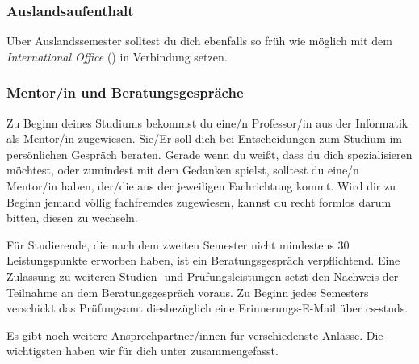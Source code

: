 \subsubsection{Auslandsaufenthalt}
	Über Auslandssemester solltest du dich ebenfalls so früh wie möglich mit dem \emph{International Office} () in Verbindung setzen.

\subsubsection{Mentor/in und Beratungsgespräche}
	Zu Beginn deines Studiums bekommst du eine/n Professor/in aus der Informatik als Mentor/in zugewiesen. Sie/Er soll dich bei Entscheidungen zum Studium im persönlichen Gespräch beraten. Gerade wenn du weißt, dass du dich spezialisieren möchtest, oder zumindest mit dem Gedanken spielst, solltest du eine/n Mentor/in haben, der/die aus der jeweiligen Fachrichtung kommt. Wird dir zu Beginn jemand völlig fachfremdes zugewiesen, kannst du recht formlos darum bitten, diesen zu wechseln.

	Für Studierende, die nach dem zweiten Semester nicht mindestens 30 Leistungspunkte erworben haben, ist ein Beratungsgespräch verpflichtend. Eine Zulassung zu weiteren Studien- und Prüfungsleistungen setzt den Nachweis der Teilnahme an dem Beratungsgespräch voraus. Zu Beginn jedes Semesters verschickt das Prüfungsamt diesbezüglich eine Erinnerungs-E-Mail über cs-studs.

Es gibt  noch weitere Ansprechpartner/innen für verschiedenste Anlässe. Die wichtigsten haben wir für dich unter  zusammengefasst.
